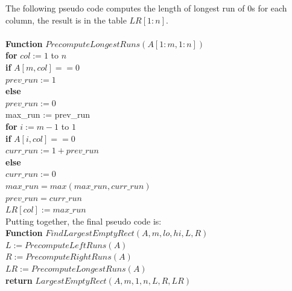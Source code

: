 \documentclass[11pt]{article}
\begin{document}
The following pseudo code computes the length of longest run of 0s for
each column, the result is in the table $LR[1:n]$.\\\\
\textbf{Function} $PrecomputeLongestRuns(A[1:m, 1:n])$\\
\-\hspace{2em} \textbf{for} $col := 1$ to $n$\\
\-\hspace{4em} \textbf{if} $A[m,col] == 0$\\
\-\hspace{6em} $prev\_run := 1$\\
\-\hspace{4em} \textbf{else}\\
\-\hspace{6em} $prev\_run := 0$\\
\-\hspace{4em} max\_run := prev\_run\\
\-\hspace{4em} \textbf{for} $i := m-1$ to $1$\\
\-\hspace{6em} \textbf{if} $A[i,col] == 0$\\
\-\hspace{8em} $curr\_run := 1 + prev\_run$\\
\-\hspace{6em} \textbf{else}\\
\-\hspace{8em} $curr\_run := 0$\\
\-\hspace{6em} $max\_run = max(max\_run, curr\_run)$\\
\-\hspace{6em} $prev\_run = curr\_run$\\
\-\hspace{4em} $LR[col] := max\_run$\\

Putting together, the final pseudo code is:\\

\textbf{Function} $FindLargestEmptyRect(A,m,lo,hi,L,R)$\\
\-\hspace{3em} $L := PrecomputeLeftRuns(A)$\\
\-\hspace{3em} $R := PrecomputeRightRuns(A)$\\
\-\hspace{3em} $LR := PrecomputeLongestRuns(A)$\\
\-\hspace{3em} \textbf{return} $LargestEmptyRect(A,m,1,n,L,R,LR)$\\
\end{document}
